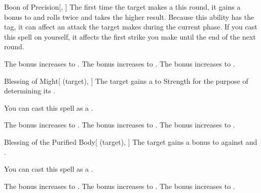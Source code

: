 \lowercase{\hypertarget{spell:Boon of Precision}{}}\label{spell:Boon of Precision}
\begin{freeability}[Rank 1]{\hypertarget{spell:Boon of Precision}{Boon of Precision}}[, ]
The first time the target makes a  this round,
it gains a  bonus to  and rolls twice and takes the higher result.
Because this ability has the  tag, it can affect an attack the target makes during the current phase.
If you cast this spell on yourself, it affects the first strike you make until the end of the next round.

\rankline
{} The bonus increases to .
 The bonus increases to .
 The bonus increases to .

\end{freeability}
\vspace{0.25em}



\lowercase{\hypertarget{spell:Blessing of Might}{}}\label{spell:Blessing of Might}
\begin{attuneability}[Rank 2]{\hypertarget{spell:Blessing of Might}{Blessing of Might}}[ (target), ]
The target gains a   to Strength for the purpose of determining its .

You can cast this spell as a .

\rankline
{} The bonus increases to .
 The bonus increases to .
 The bonus increases to .

\end{attuneability}
\vspace{0.25em}



\lowercase{\hypertarget{spell:Blessing of the Purified Body}{}}\label{spell:Blessing of the Purified Body}
\begin{attuneability}[Rank 2]{\hypertarget{spell:Blessing of the Purified Body}{Blessing of the Purified Body}}[ (target), ]
The target gains a  bonus to  against  and .

You can cast this spell as a .

\rankline
{} The bonus increases to .
 The bonus increases to .
 The bonus increases to .

\end{attuneability}
\vspace{0.25em}



